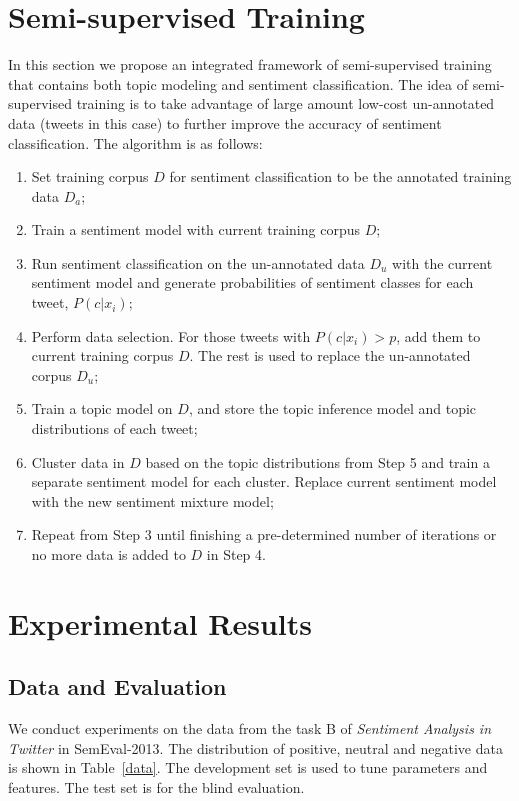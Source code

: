 \documentclass[11pt]{article}
\begin{document}
\section{Semi-supervised Training}
In this section we propose an integrated framework of semi-supervised training that contains both topic modeling
and sentiment classification. The idea of semi-supervised training is to take advantage of large amount low-cost
un-annotated data (tweets in this case) to further improve the accuracy of sentiment classification. The algorithm
is as follows:

\begin{enumerate}
\item Set training corpus $D$ for sentiment classification to be the annotated training data $D_a$;
\item Train a sentiment model with current training corpus $D$; 
\item Run sentiment classification on the un-annotated data $D_u$ with the current sentiment model and 
generate probabilities of sentiment classes for each tweet, $P(c|x_i)$;
\item Perform data selection. For those tweets with $P(c|x_i) > p$, add them to current training corpus $D$. The rest
is used to replace the un-annotated corpus $D_u$;
\item Train a topic model on $D$, and store the topic inference model and topic distributions of each tweet; 
\item Cluster data in $D$ based on the topic distributions from Step 5 and train a separate sentiment model for
each cluster. Replace current sentiment model with the new sentiment mixture model;
\item Repeat from Step 3 until finishing a pre-determined number of iterations or no more data is added to $D$ in Step 4. 
\end{enumerate}

\section{Experimental Results}

\subsection{Data and Evaluation}
We conduct experiments on the data from the task B of \textit{Sentiment Analysis in Twitter}
in SemEval-2013. The distribution of positive, neutral and negative data is shown in Table~\ref{data}.
The development set is used to tune parameters and features. The test set is for the blind evaluation.
\end{document}
